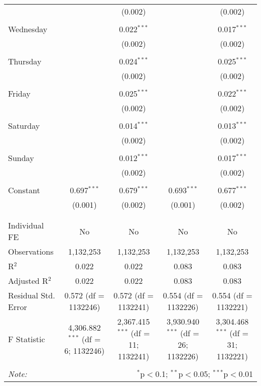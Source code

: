 \documentclass[
]{article}
\begin{document}
\begin{table}[!htbp]
{\begin{tabular}{@{\extracolsep{5pt}}lcccc}
  &  & (0.002) &  & (0.002) \\ 
  & & & & \\ 
 Wednesday &  & 0.022$^{***}$ &  & 0.017$^{***}$ \\ 
  &  & (0.002) &  & (0.002) \\ 
  & & & & \\ 
 Thursday &  & 0.024$^{***}$ &  & 0.025$^{***}$ \\ 
  &  & (0.002) &  & (0.002) \\ 
  & & & & \\ 
 Friday &  & 0.025$^{***}$ &  & 0.022$^{***}$ \\ 
  &  & (0.002) &  & (0.002) \\ 
  & & & & \\ 
 Saturday &  & 0.014$^{***}$ &  & 0.013$^{***}$ \\ 
  &  & (0.002) &  & (0.002) \\ 
  & & & & \\ 
 Sunday &  & 0.012$^{***}$ &  & 0.017$^{***}$ \\ 
  &  & (0.002) &  & (0.002) \\ 
  & & & & \\ 
 Constant & 0.697$^{***}$ & 0.679$^{***}$ & 0.693$^{***}$ & 0.677$^{***}$ \\ 
  & (0.001) & (0.002) & (0.001) & (0.002) \\ 
  & & & & \\ 
\hline \\[-1.8ex] 
Individual FE & No & No & No & No \\ 
Observations & 1,132,253 & 1,132,253 & 1,132,253 & 1,132,253 \\ 
R$^{2}$ & 0.022 & 0.022 & 0.083 & 0.083 \\ 
Adjusted R$^{2}$ & 0.022 & 0.022 & 0.083 & 0.083 \\ 
Residual Std. Error & 0.572 (df = 1132246) & 0.572 (df = 1132241) & 0.554 (df = 1132226) & 0.554 (df = 1132221) \\ 
F Statistic & 4,306.882$^{***}$ (df = 6; 1132246) & 2,367.415$^{***}$ (df = 11; 1132241) & 3,930.940$^{***}$ (df = 26; 1132226) & 3,304.468$^{***}$ (df = 31; 1132221) \\ 
\hline 
\hline \\[-1.8ex] 
\textit{Note:}  & \multicolumn{4}{r}{$^{*}$p$<$0.1; $^{**}$p$<$0.05; $^{***}$p$<$0.01} \\ 
\end{tabular}
} 
\end{table} 
\newpage
\end{document}
